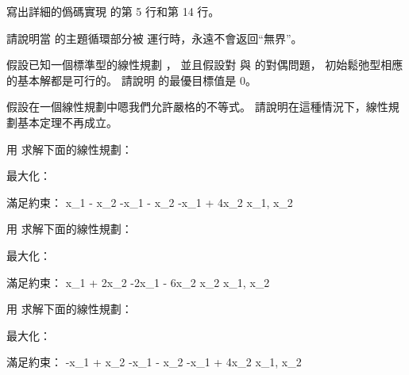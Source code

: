 \startsection[
  title={The initial basic feasible solution},
]

\startEXERCISE
寫出詳細的僞碼實現  的第 5 行和第 14 行。
\stopEXERCISE

\startANSWER
{}
\stopANSWER

\startEXERCISE
請說明當  的主題循環部分被  運行時，永遠不會返回“無界”。
\stopEXERCISE

\startANSWER
{}
\stopANSWER

\startEXERCISE
假設已知一個標準型的線性規劃 ，
並且假設對  與  的對偶問題，
初始鬆弛型相應的基本解都是可行的。
請說明  的最優目標值是 0。
\stopEXERCISE

\startANSWER
{}
\stopANSWER

\startEXERCISE
假設在一個線性規劃中嗯我們允許嚴格的不等式。
請說明在這種情況下，線性規劃基本定理不再成立。
\stopEXERCISE

\startANSWER
{}
\stopANSWER

\startEXERCISE
用  求解下面的線性規劃：

最大化： 

滿足約束：
\startformula\startmathalignment[n=5,
align={right,right,right,right,middle}]
\NC  x_1 \NC - \NC  x_2 \NC \le {} \NR
\NC -x_1 \NC - \NC  x_2 \NC \le {} \NR
\NC -x_1 \NC + \NC 4x_2 \NC \le {} \NR
\NC     \NC x_1, \NC x_2 \NC \ge {} \NR
\stopmathalignment\stopformula
\stopEXERCISE

\startANSWER
{}
\stopANSWER

\startEXERCISE
用  求解下面的線性規劃：

最大化： 

滿足約束：
\startformula\startmathalignment[n=5,
align={right,right,right,right,middle}]
\NC   x_1 \NC + \NC 2x_2 \NC \le {} \NR
\NC -2x_1 \NC - \NC 6x_2 \NC \le {} \NR
\NC       \NC   \NC  x_2 \NC \le {} \NR
\NC     \NC x_1, \NC x_2 \NC \ge {} \NR
\stopmathalignment\stopformula
\stopEXERCISE

\startANSWER
{}
\stopANSWER

\startEXERCISE
用  求解下面的線性規劃：

最大化： 

滿足約束：
\startformula\startmathalignment[n=5,
align={right,right,right,right,middle}]
\NC  -x_1 \NC + \NC  x_2 \NC \le {} \NR
\NC  -x_1 \NC - \NC  x_2 \NC \le {} \NR
\NC  -x_1 \NC + \NC 4x_2 \NC \le {} \NR
\NC     \NC x_1, \NC x_2 \NC \ge {} \NR
\stopmathalignment\stopformula
\stopEXERCISE

